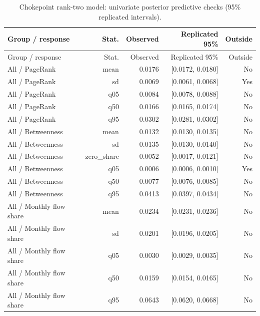\documentclass[pdftex,12pt,openright,a4paper,oneside]{book}
\begin{document}
\begin{longtable}{@{}p{}rrrr@{}}

\caption{Chokepoint rank-two model: univariate posterior predictive checks (95\% replicated intervals).}\label{tab:chokepoint_rank2_ppc_univariate}\\

\toprule

Group / response & Stat. & Observed & Replicated 95\% & Outside \\

\midrule\endfirsthead

\toprule

Group / response & Stat. & Observed & Replicated 95\% & Outside \\

\midrule\endhead

All / PageRank & mean & 0.0176 & [0.0172, 0.0180] & No \\

All / PageRank & sd & 0.0069 & [0.0061, 0.0068] & Yes \\

All / PageRank & q05 & 0.0084 & [0.0078, 0.0088] & No \\

All / PageRank & q50 & 0.0166 & [0.0165, 0.0174] & No \\

All / PageRank & q95 & 0.0302 & [0.0281, 0.0302] & No \\

All / Betweenness & mean & 0.0132 & [0.0130, 0.0135] & No \\

All / Betweenness & sd & 0.0135 & [0.0130, 0.0140] & No \\

All / Betweenness & zero\_share & 0.0052 & [0.0017, 0.0121] & No \\

All / Betweenness & q05 & 0.0006 & [0.0006, 0.0010] & Yes \\

All / Betweenness & q50 & 0.0077 & [0.0076, 0.0085] & No \\

All / Betweenness & q95 & 0.0413 & [0.0397, 0.0434] & No \\

All / Monthly flow share & mean & 0.0234 & [0.0231, 0.0236] & No \\

All / Monthly flow share & sd & 0.0201 & [0.0196, 0.0205] & No \\

All / Monthly flow share & q05 & 0.0030 & [0.0029, 0.0035] & No \\

All / Monthly flow share & q50 & 0.0159 & [0.0154, 0.0165] & No \\

All / Monthly flow share & q95 & 0.0643 & [0.0620, 0.0668] & No \\

\bottomrule\end{longtable}
\end{document}

